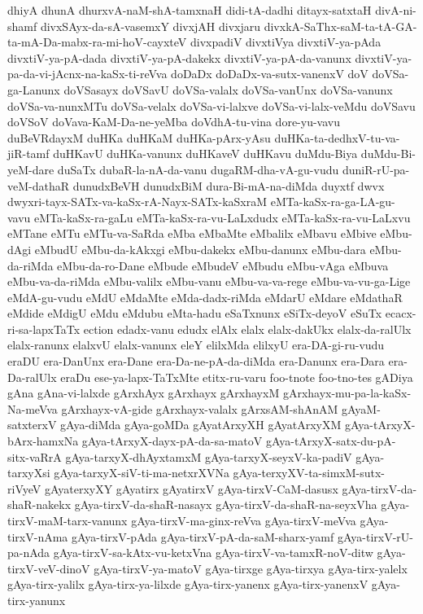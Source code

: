 {dhiyA
dhunA
dhurxvA-naM-shA-tamxnaH
didi-tA-dadhi
ditayx-satxtaH
divA-ni-shamf
divxSAyx-da-sA-vasemxY
divxjAH
divxjaru
divxkA-SaThx-saM-ta-tA-GA-ta-mA-Da-mabx-ra-mi-hoV-cayxteV
divxpadiV
divxtiVya
divxtiV-ya-pAda
divxtiV-ya-pA-dada
divxtiV-ya-pA-dakekx
divxtiV-ya-pA-da-vanunx
divxtiV-ya-pa-da-vi-jAcnx-na-kaSx-ti-reVva
doDaDx
doDaDx-va-sutx-vanenxV
doV
doVSa-ga-Lanunx
doVSasayx
doVSavU
doVSa-valalx
doVSa-vanUnx
doVSa-vanunx
doVSa-va-nunxMTu
doVSa-velalx
doVSa-vi-lalxve
doVSa-vi-lalx-veMdu
doVSavu
doVSoV
doVava-KaM-Da-ne-yeMba
doVdhA-tu-vina
dore-yu-vavu
duBeVRdayxM
duHKa
duHKaM
duHKa-pArx-yAsu
duHKa-ta-dedhxV-tu-va-jiR-tamf
duHKavU
duHKa-vanunx
duHKaveV
duHKavu
duMdu-Biya
duMdu-Bi-yeM-dare
duSaTx
dubaR-la-nA-da-vanu
dugaRM-dha-vA-gu-vudu
duniR-rU-pa-veM-dathaR
dunudxBeVH
dunudxBiM
dura-Bi-mA-na-diMda
duyxtf
dwvx
dwyxri-tayx-SATx-va-kaSx-rA-Nayx-SATx-kaSxraM
eMTa-kaSx-ra-ga-LA-gu-vavu
eMTa-kaSx-ra-gaLu
eMTa-kaSx-ra-vu-LaLxdudx
eMTa-kaSx-ra-vu-LaLxvu
eMTane
eMTu
eMTu-va-SaRda
eMba
eMbaMte
eMbalilx
eMbavu
eMbive
eMbu-dAgi
eMbudU
eMbu-da-kAkxgi
eMbu-dakekx
eMbu-danunx
eMbu-dara
eMbu-da-riMda
eMbu-da-ro-Dane
eMbude
eMbudeV
eMbudu
eMbu-vAga
eMbuva
eMbu-va-da-riMda
eMbu-valilx
eMbu-vanu
eMbu-va-va-rege
eMbu-va-vu-ga-Lige
eMdA-gu-vudu
eMdU
eMdaMte
eMda-dadx-riMda
eMdarU
eMdare
eMdathaR
eMdide
eMdigU
eMdu
eMdubu
eMta-hadu
eSaTxnunx
eSiTx-deyoV
eSuTx
ecacx-ri-sa-lapxTaTx
ection
edadx-vanu
edudx
elAlx
elalx
elalx-dakUkx
elalx-da-ralUlx
elalx-ranunx
elalxvU
elalx-vanunx
eleY
elilxMda
elilxyU
era-DA-gi-ru-vudu
eraDU
era-DanUnx
era-Dane
era-Da-ne-pA-da-diMda
era-Danunx
era-Dara
era-Da-ralUlx
eraDu
ese-ya-lapx-TaTxMte
etitx-ru-varu
foo-tnote
foo-tno-tes
gADiya
gAna
gAna-vi-lalxde
gArxhAyx
gArxhayx
gArxhayxM
gArxhayx-mu-pa-la-kaSx-Na-meVva
gArxhayx-vA-gide
gArxhayx-valalx
gArxsAM-shAnAM
gAyaM-satxterxV
gAya-diMda
gAya-goMDa
gAyatArxyXH
gAyatArxyXM
gAya-tArxyX-bArx-hamxNa
gAya-tArxyX-dayx-pA-da-sa-matoV
gAya-tArxyX-satx-du-pA-sitx-vaRrA
gAya-tarxyX-dhAyxtamxM
gAya-tarxyX-seyxV-ka-padiV
gAya-tarxyXsi
gAya-tarxyX-siV-ti-ma-netxrXVNa
gAya-terxyXV-ta-simxM-sutx-riVyeV
gAyaterxyXY
gAyatirx
gAyatirxV
gAya-tirxV-CaM-dasusx
gAya-tirxV-da-shaR-nakekx
gAya-tirxV-da-shaR-nasayx
gAya-tirxV-da-shaR-na-seyxVha
gAya-tirxV-maM-tarx-vanunx
gAya-tirxV-ma-ginx-reVva
gAya-tirxV-meVva
gAya-tirxV-nAma
gAya-tirxV-pAda
gAya-tirxV-pA-da-saM-sharx-yamf
gAya-tirxV-rU-pa-nAda
gAya-tirxV-sa-kAtx-vu-ketxVna
gAya-tirxV-va-tamxR-noV-ditw
gAya-tirxV-veV-dinoV
gAya-tirxV-ya-matoV
gAya-tirxge
gAya-tirxya
gAya-tirx-yalelx
gAya-tirx-yalilx
gAya-tirx-ya-lilxde
gAya-tirx-yanenx
gAya-tirx-yanenxV
gAya-tirx-yanunx
}
